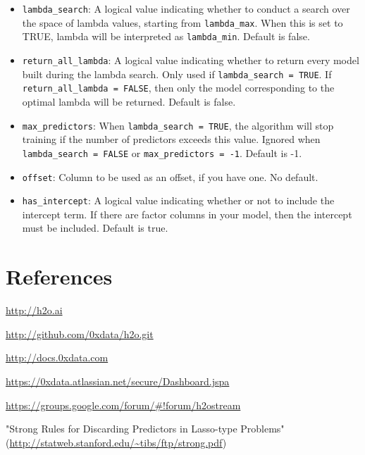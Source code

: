 \documentclass[11pt]{article}
\begin{document}
\begin{itemize}
\item \texttt{lambda\_search}: A logical value indicating whether to conduct a search over the space of lambda values, starting from \texttt{lambda\_max}. When this is set to TRUE, lambda will be interpreted as \texttt{lambda\_min}. Default is false.
\item \texttt{return\_all\_lambda}: A logical value indicating whether to return every model built during the lambda search. Only used if \texttt{lambda\_search = TRUE}. If \texttt{return\_all\_lambda = FALSE}, then only the model corresponding to the optimal lambda will be returned. Default is false.
\item \texttt{max\_predictors}: When \texttt{lambda\_search = TRUE}, the algorithm will stop training if the number of predictors exceeds this value. Ignored when \texttt{ lambda\_search = FALSE} or \texttt{max\_predictors = -1}. Default is -1.
\item \texttt{offset}: Column to be used as an offset, if you have one. No default.
\item \texttt{has\_intercept}: A logical value indicating whether or not to include the intercept term. If there are factor columns in your model, then the intercept must be included. Default is true.


\end{itemize}



\newpage
\section{References}


\url{http://h2o.ai}

\url{http://github.com/0xdata/h2o.git}

\url{http://docs.0xdata.com}

\url{https://0xdata.atlassian.net/secure/Dashboard.jspa}

\url{https://groups.google.com/forum/#!forum/h2ostream}

"Strong Rules for Discarding Predictors in Lasso-type Problems" (\url{http://statweb.stanford.edu/~tibs/ftp/strong.pdf})
\end{document}
